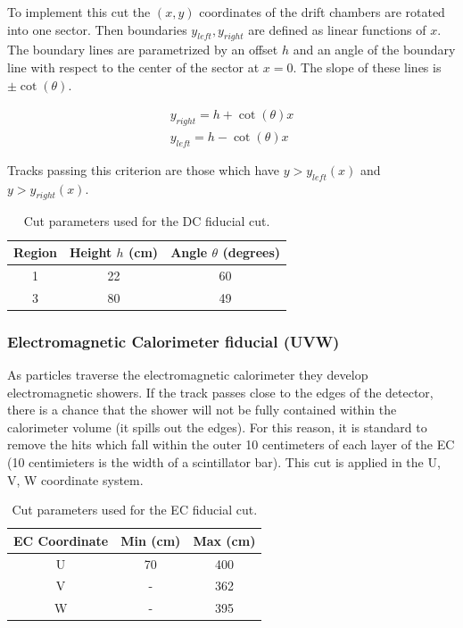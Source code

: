 To implement this cut the $(x,y)$ coordinates of the drift chambers are rotated into one sector.  Then boundaries $y_{left}, y_{right}$ are defined as linear functions of $x$. The boundary lines are parametrized by an offset $h$ and an angle of the boundary line with respect to the center of the sector at $x = 0$.  The slope of these lines is $\pm \cot(\theta)$.  

\begin{eqnarray}
  y_{right} = h + \cot(\theta) x \\
  y_{left} = h - \cot(\theta) x
\end{eqnarray}

Tracks passing this criterion are those which have $y > y_{left}(x)$ and $y > y_{right}(x)$.  

\begin{table}
  \centering
  \begin{tabular}{c|c|c}
    Region & Height $h$ (cm) & Angle $\theta$ (degrees)\\
    \hline 
    1 & 22 & 60 \\
    3 & 80 & 49
  \end{tabular}
  \caption{Cut parameters used for the DC fiducial cut.}
\end{table}


\subsubsection*{Electromagnetic Calorimeter fiducial (UVW)}
As particles traverse the electromagnetic calorimeter they develop electromagnetic showers.  If the track passes close to the edges of the detector, there is a chance that the shower will not be fully contained within the calorimeter volume (it spills out the edges).  For this reason, it is standard to remove the hits which fall within the outer 10 centimeters of each layer of the EC (10 centimieters is the width of a scintillator bar).  This cut is applied in the U, V, W coordinate system.  

\begin{table}
  \centering
  \begin{tabular}{c|c|c}
    EC Coordinate & Min (cm) & Max (cm) \\
    \hline 
    U & 70 & 400 \\
    V & - & 362 \\
    W & - & 395
  \end{tabular}
  \caption{Cut parameters used for the EC fiducial cut.}
\end{table}

